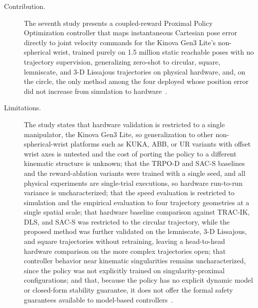 \begin{description}
    \item[Contribution.] The seventh study presents a coupled-reward Proximal Policy Optimization
    controller that maps instantaneous Cartesian pose error directly to joint velocity commands for
    the Kinova Gen3 Lite's non-spherical wrist, trained purely on 1.5 million static reachable poses
    with no trajectory supervision, generalizing zero-shot to circular, square, lemniscate, and 3-D
    Lissajous trajectories on physical hardware, and, on the circle, the only method among the four
    deployed whose position error did not increase from simulation to hardware~\citep{sk2025diktracking}.

    \item[Limitations.] The study states that hardware validation is restricted to a single
    manipulator, the Kinova Gen3 Lite, so generalization to other non-spherical-wrist platforms such
    as KUKA, ABB, or UR variants with offset wrist axes is untested and the cost of porting the
    policy to a different kinematic structure is unknown; that the TRPO-D and SAC-S baselines and the
    reward-ablation variants were trained with a single seed, and all physical experiments are
    single-trial executions, so hardware run-to-run variance is uncharacterized; that the speed
    evaluation is restricted to simulation and the empirical evaluation to four trajectory
    geometries at a single spatial scale; that hardware baseline comparison against TRAC-IK, DLS, and SAC-S was restricted to
    the circular trajectory, while the proposed method was further validated on the lemniscate,
    3-D Lissajous, and square trajectories without retraining, leaving a head-to-head hardware
    comparison on the more complex trajectories open; that controller behavior near kinematic
    singularities remains uncharacterized, since the policy was not explicitly trained on
    singularity-proximal configurations; and that, because the policy has no explicit dynamic model
    or closed-form stability guarantee, it does not offer the formal safety guarantees available to
    model-based controllers~\citep{sk2025diktracking}.


\end{description}
